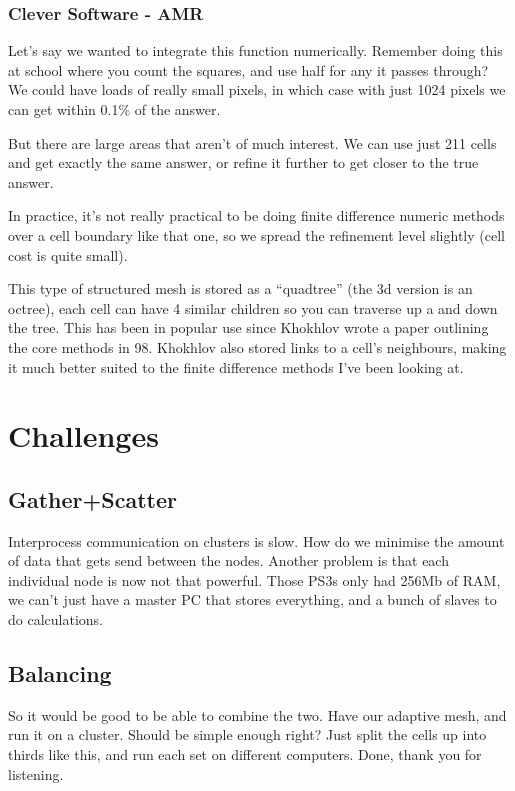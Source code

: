 \documentclass[10pt]{article}
\begin{document}
        \subsubsection{Clever Software - AMR}
            Let's say we wanted to integrate this function numerically. Remember doing this at school where you count the squares, and use half for any it passes through? We could have loads of really small pixels, in which case with just 1024 pixels we can get within 0.1\% of the answer.
            
            But there are large areas that aren't of much interest. We can use just 211 cells and get exactly the same answer, or refine it further to get closer to the true answer.
            
            In practice, it's not really practical to be doing finite difference numeric methods over a cell boundary like that one, so we spread the refinement level slightly (cell cost is quite small).
            
            This type of structured mesh is stored as a ``quadtree'' (the 3d version is an octree), each cell can have 4 similar children so you can traverse up a and down the tree. This has been in popular use since Khokhlov wrote a paper outlining the core methods in 98. Khokhlov also stored links to a cell's neighbours, making it much better suited to the finite difference methods I've been looking at.


\section{Challenges}

	\subsection{Gather+Scatter}
	
		Interprocess communication on clusters is slow. How do we minimise the amount of data that gets send between the nodes. Another problem is that each individual node is now not that powerful. Those PS3s only had 256Mb of RAM, we can't just have a master PC that stores everything, and a bunch of slaves to do calculations. 
		
	\subsection{Balancing}
	
		So it would be good to be able to combine the two. Have our adaptive mesh, and run it on a cluster. Should be simple enough right? Just split the cells up into thirds like this, and run each set on different computers. Done, thank you for listening. 
		
\end{document}

